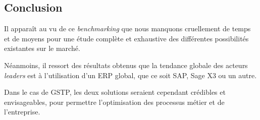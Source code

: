 \subsection{Conclusion}

Il apparaît au vu de ce {\sl benchmarking} que nous manquons
cruellement de temps et de moyens pour une étude complète
et exhaustive des différentes possibilités existantes sur le
marché.

Néanmoins, il ressort des résultats obtenus que la tendance
globale des acteurs {\sl leaders} est à l'utilisation d'un
ERP global, que ce soit SAP, Sage X3 ou un autre.

Dans le cas de GSTP, les deux solutions seraient cependant
crédibles et envisageables, pour permettre l'optimisation des
processus métier et de l'entreprise.

\vfill
\pagebreak
